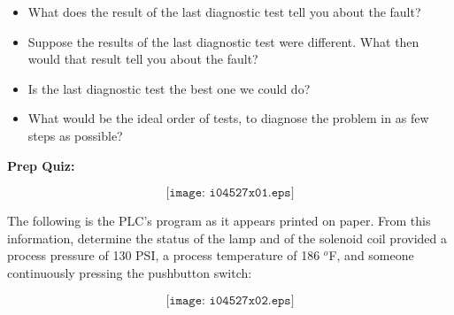\begin{itemize}
\item{} What does the result of the last diagnostic test tell you about the fault?
\item{} Suppose the results of the last diagnostic test were different.  What then would that result tell you about the fault?
\item{} Is the last diagnostic test the best one we could do?
\item{} What would be the ideal order of tests, to diagnose the problem in as few steps as possible?
\end{itemize}


\vfil \eject

\noindent
{\bf Prep Quiz:}

$$\texttt{[image: i04527x01.eps]}$$

The following is the PLC's program as it appears printed on paper.  From this information, determine the status of the lamp and of the solenoid coil provided a process pressure of 130 PSI, a process temperature of 186 $^{o}$F, and someone continuously pressing the pushbutton switch:

$$\texttt{[image: i04527x02.eps]}$$





